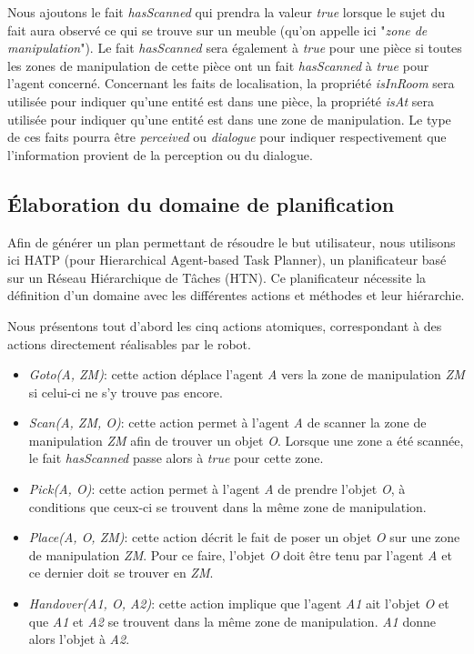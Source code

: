 \documentclass[a4paper,11pt,twoside]{StyleThese}
\begin{document}
Nous ajoutons le fait \textit{hasScanned} qui prendra la valeur \textit{true} lorsque 
le sujet du fait aura observé ce qui se trouve sur un meuble (qu'on appelle ici "\textit{zone de manipulation}"). Le fait \textit{hasScanned} sera également à \textit{true} pour une pièce si toutes les zones de manipulation de cette pièce ont un fait \textit{hasScanned} à \textit{true} pour l'agent concerné.
Concernant les faits de localisation, la propriété \textit{isInRoom} sera utilisée pour indiquer qu'une entité est dans une pièce, la propriété \textit{isAt} sera utilisée pour indiquer qu'une entité est dans une zone de manipulation. Le type de ces faits pourra être \textit{perceived} ou \textit{dialogue} pour indiquer respectivement que l'information provient de la perception ou du dialogue.


\subsection{Élaboration du domaine de planification}
\label{sec:domainehatp}

Afin de générer un plan permettant de résoudre le but utilisateur, nous utilisons ici HATP \cite{lallement14} (pour Hierarchical Agent-based Task Planner), un planificateur basé sur un Réseau Hiérarchique de Tâches (HTN).
Ce planificateur nécessite la définition d'un domaine avec les différentes actions et méthodes et leur hiérarchie.

Nous présentons tout d'abord les cinq actions atomiques, correspondant à des actions directement réalisables par le robot.

\begin{itemize}
\item \textit{Goto(A, ZM)}: cette action déplace l'agent \textit{A} vers la zone de manipulation \textit{ZM} si celui-ci ne s'y trouve pas encore.
\item \textit{Scan(A, ZM, O)}: cette action permet à l'agent \textit{A} de scanner la zone de manipulation \textit{ZM} afin de trouver un objet \textit{O}.
Lorsque une zone a été scannée, le fait \textit{hasScanned} passe alors à \textit{true} pour cette zone.
\item \textit{Pick(A, O)}: cette action permet à l'agent \textit{A} de prendre l'objet \textit{O}, à conditions que ceux-ci se trouvent dans la même zone de manipulation.
\item \textit{Place(A, O, ZM)}: cette action décrit le fait de poser un objet \textit{O} sur une zone de manipulation \textit{ZM}. Pour ce faire, l'objet \textit{O} doit être tenu par l'agent \textit{A} et ce dernier doit se trouver en \textit{ZM}.
\item \textit{Handover(A1, O, A2)}: cette action implique que l'agent \textit{A1} ait l'objet \textit{O} et que \textit{A1} et \textit{A2} se trouvent dans la même zone de manipulation. \textit{A1} donne alors l'objet à \textit{A2}.
\end{itemize}
 
\end{document}
